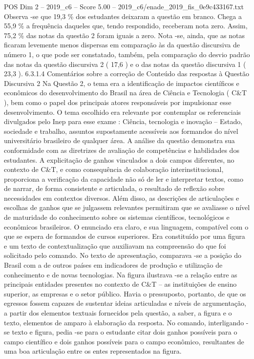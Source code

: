 \begin{textsample}{POS Dim 2 – 2019\_c6 – Score 5.00 – 2019\_c6/enade\_2019\_fis\_0e9c433167.txt}
Observa -se que 19,3 \% dos estudantes deixaram a questão em branco.
Chega a 55,9 \% a frequência daqueles que, tendo respondido, receberam nota zero.
Assim, 75,2 \% das notas da questão 2 foram iguais a zero.
Nota -se, ainda, que as notas ficaram levemente menos dispersas em comparação às da questão discursiva de número 1, o que pode ser constatado, também, pela comparação do desvio padrão das notas da questão discursiva 2 ( 17,6 ) e o das notas da questão discursiva 1 ( 23,3 ). 6.3.1.4 Comentários sobre a correção de Conteúdo das respostas à Questão Discursiva 2 Na Questão 2, o tema era a identificação de impactos científicos e econômicos do desenvolvimento do Brasil na área de Ciência e Tecnologia ( C\&T ), bem como o papel dos principais atores responsáveis por impulsionar esse desenvolvimento.
O tema escolhido era relevante por contemplar os referenciais divulgados pelo Inep para esse exame : Ciência, tecnologia e inovação – Estado, sociedade e trabalho, assuntos supostamente acessíveis aos formandos do nível universitário brasileiro de qualquer área.
A análise da questão demonstra sua conformidade com as diretrizes de avaliação de competências e habilidades dos estudantes.
A explicitação de ganhos vinculados a dois campos diferentes, no contexto de C\&T, e como consequência de colaboração interinstitucional, proporciona a verificação da capacidade não só de ler e interpretar textos, como de narrar, de forma consistente e articulada, o resultado de reflexão sobre necessidades em contextos diversos.
Além disso, as descrições de articulações e escolhas de ganhos que se julgassem relevantes permitiram que se avaliasse o nível de maturidade do conhecimento sobre os sistemas científicos, tecnológicos e econômicos brasileiros.
O enunciado era claro, e sua linguagem, compatível com o que se espera de formandos de cursos superiores.
Era constituído por uma figura e um texto de contextualização que auxiliavam na compreensão do que foi solicitado pelo comando.
No texto de apresentação, comparava -se a posição do Brasil com a de outros países em indicadores de produção e utilização de conhecimento e de novas tecnologias.
Na figura ilustrava -se a relação entre as principais entidades presentes no contexto de C\&T – as instituições de ensino superior, as empresas e o setor público.
Havia o pressuposto, portanto, de que os egressos fossem capazes de sustentar ideias articuladas e níveis de argumentação, a partir dos elementos textuais fornecidos pela questão, a saber, a figura e o texto, elementos de amparo à elaboração da resposta.
No comando, interligando -se texto e figura, pedia -se para o estudante citar dois ganhos possíveis para o campo científico e dois ganhos possíveis para o campo econômico, resultantes de uma boa articulação entre os entes representados na figura.

\end{textsample}
